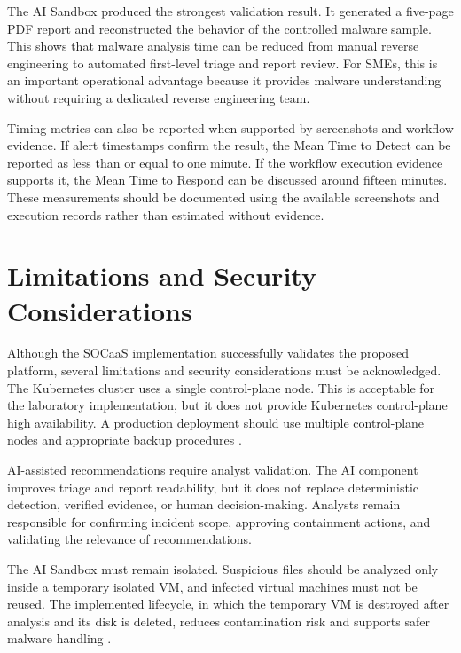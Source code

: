 The AI Sandbox produced the strongest validation result. It generated a five-page PDF report and reconstructed the behavior of the controlled malware sample. This shows that malware analysis time can be reduced from manual reverse engineering to automated first-level triage and report review. For SMEs, this is an important operational advantage because it provides malware understanding without requiring a dedicated reverse engineering team.

Timing metrics can also be reported when supported by screenshots and workflow evidence. If alert timestamps confirm the result, the Mean Time to Detect can be reported as less than or equal to one minute. If the workflow execution evidence supports it, the Mean Time to Respond can be discussed around fifteen minutes. These measurements should be documented using the available screenshots and execution records rather than estimated without evidence.

\section{Limitations and Security Considerations}
\label{sec:ch4-limitations}

Although the SOCaaS implementation successfully validates the proposed platform, several limitations and security considerations must be acknowledged. The Kubernetes cluster uses a single control-plane node. This is acceptable for the laboratory implementation, but it does not provide Kubernetes control-plane high availability. A production deployment should use multiple control-plane nodes and appropriate backup procedures \cite{k8s-docs,luksa2017kubernetes}.

AI-assisted recommendations require analyst validation. The AI component improves triage and report readability, but it does not replace deterministic detection, verified evidence, or human decision-making. Analysts remain responsible for confirming incident scope, approving containment actions, and validating the relevance of recommendations.

The AI Sandbox must remain isolated. Suspicious files should be analyzed only inside a temporary isolated VM, and infected virtual machines must not be reused. The implemented lifecycle, in which the temporary VM is destroyed after analysis and its disk is deleted, reduces contamination risk and supports safer malware handling \cite{sikorski2012malware,nist-sp800-83r1}.

